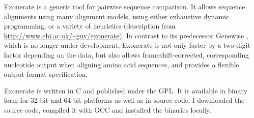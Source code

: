 Exonerate \citep{slater2005} is a generic tool for pairwise sequence comparison.
It allows sequence alignments using many alignment models, using either
exhaustive dynamic programming, or a variety of heuristics (description from
\url{http://www.ebi.ac.uk/~guy/exonerate}). In contrast to its predecessor
Genewise \citep{birney2004}, which is no longer under development, Exonerate is
not only faster by a two-digit factor depending on the data, but also allows
frameshift-corrected, corresponding nucleotide output when aligning amino acid
sequences, and provides a flexible output format specification.

Exonerate is written in C and published under the GPL. It is available in binary
form for 32-bit and 64-bit platforms as well as in source code. I downloaded the
source code, compiled it with GCC and installed the binaries locally.
